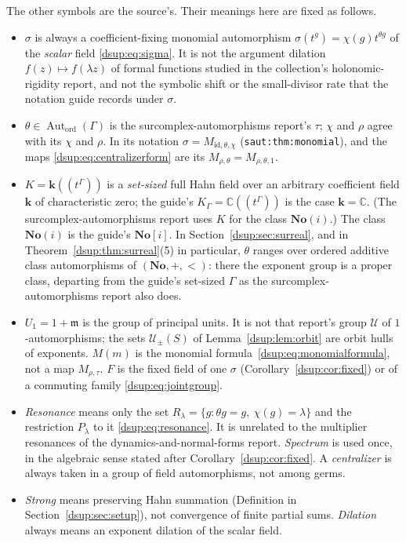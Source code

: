 \documentclass[11pt,oneside]{article}
\numberwithin{equation}{section}
\theoremstyle{definition}
\theoremstyle{remark}
\newcommand{\No}{\mathbf{No}}
\newcommand{\SC}{\No(i)}
\newcommand{\C}{\mathbb C}
\newcommand{\kk}{\mathbf k}
\newcommand{\mm}{\mathfrak m}
\newcommand{\id}{\mathrm{id}}
\newcommand{\Aut}{\operatorname{Aut}}
\newcommand{\lbl}[1]{\nolinkurl{#1}}%
\begin{document}
The other symbols are the source's. Their meanings here are fixed as
follows.
\begin{itemize}[leftmargin=*,itemsep=3pt]
\item $\sigma$ is always a coefficient-fixing monomial automorphism
$\sigma(t^g)=\chi(g)t^{\theta g}$ of the \emph{scalar} field
\eqref{dsup:eq:sigma}. It is not the argument dilation $f(z)\mapsto
f(\lambda z)$ of formal functions studied in the collection's
holonomic-rigidity report, and not the symbolic shift or the small-divisor
rate that the notation guide records under $\sigma$.
\item $\theta\in\Aut_{\mathrm{ord}}(\Gamma)$ is the surcomplex-automorphisms
report's $\tau$; $\chi$ and $\rho$ agree with its $\chi$ and $\rho$. In its
notation $\sigma=M_{\id,\theta,\chi}$ (\lbl{saut:thm:monomial}), and the maps
\eqref{dsup:eq:centralizerform} are its $M_{\rho,\theta}=M_{\rho,\theta,1}$.
\item $K=\kk((t^\Gamma))$ is a \emph{set-sized} full Hahn field over an
arbitrary coefficient field $\kk$ of characteristic zero; the guide's
$K_\Gamma=\C((t^\Gamma))$ is the case $\kk=\C$. (The surcomplex-automorphisms
report uses $K$ for the class $\No(i)$.) The class $\SC$ is the guide's
$\No[i]$. In Section~\ref{dsup:sec:surreal}, and in
Theorem~\ref{dsup:thm:surreal}(5) in particular, $\theta$ ranges over ordered
additive class automorphisms of $(\No,+,<)$: there the exponent group is a
proper class, departing from the guide's set-sized $\Gamma$ as the
surcomplex-automorphisms report also does.
\item $U_1=1+\mm$ is the group of principal units. It is not that report's
group $\mathcal U$ of $1$-automorphisms; the sets $\mathcal U_\pm(S)$ of
Lemma~\ref{dsup:lem:orbit} are orbit hulls of exponents. $M(m)$ is the
monomial formula~\eqref{dsup:eq:monomialformula}, not a map $M_{\rho,\tau}$.
$F$ is the fixed field of one $\sigma$ (Corollary~\ref{dsup:cor:fixed}) or of
a commuting family \eqref{dsup:eq:jointgroup}.
\item \emph{Resonance} means only the set
$R_\lambda=\{g:\theta g=g,\ \chi(g)=\lambda\}$ and the restriction
$P_\lambda$ to it \eqref{dsup:eq:resonance}. It is unrelated to the
multiplier resonances of the dynamics-and-normal-forms report.
\emph{Spectrum} is used once, in the algebraic sense stated after
Corollary~\ref{dsup:cor:fixed}. A \emph{centralizer} is always taken in a
group of field automorphisms, not among germs.
\item \emph{Strong} means preserving Hahn summation
(Definition in Section~\ref{dsup:sec:setup}), not convergence of finite
partial sums. \emph{Dilation} always means an exponent dilation of the
scalar field.
\end{itemize}
\end{document}
